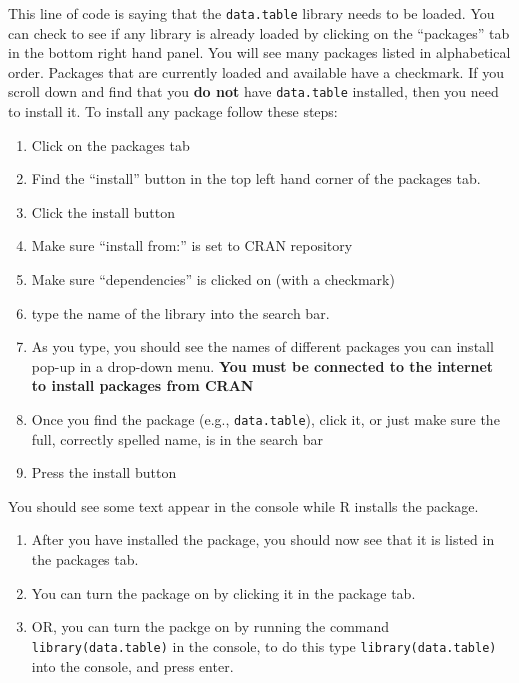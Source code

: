 \documentclass[
]{book}
\providecommand{\tightlist}{%
  \setlength{\itemsep}{0pt}\setlength{\parskip}{0pt}}
\begin{document}
This line of code is saying that the \texttt{data.table} library needs to be loaded. You can check to see if any library is already loaded by clicking on the ``packages'' tab in the bottom right hand panel. You will see many packages listed in alphabetical order. Packages that are currently loaded and available have a checkmark. If you scroll down and find that you \textbf{do not} have \texttt{data.table} installed, then you need to install it. To install any package follow these steps:

\begin{enumerate}
\def\labelenumi{\arabic{enumi}.}
\tightlist
\item
  Click on the packages tab
\item
  Find the ``install'' button in the top left hand corner of the packages tab.
\item
  Click the install button
\item
  Make sure ``install from:'' is set to CRAN repository
\item
  Make sure ``dependencies'' is clicked on (with a checkmark)
\item
  type the name of the library into the search bar.
\item
  As you type, you should see the names of different packages you can install pop-up in a drop-down menu. \textbf{You must be connected to the internet to install packages from CRAN}
\item
  Once you find the package (e.g., \texttt{data.table}), click it, or just make sure the full, correctly spelled name, is in the search bar
\item
  Press the install button
\end{enumerate}

You should see some text appear in the console while R installs the package.

\begin{enumerate}
\def\labelenumi{\arabic{enumi}.}
\setcounter{enumi}{9}
\tightlist
\item
  After you have installed the package, you should now see that it is listed in the packages tab.
\item
  You can turn the package on by clicking it in the package tab.
\item
  OR, you can turn the packge on by running the command \texttt{library(data.table)} in the console, to do this type \texttt{library(data.table)} into the console, and press enter.
\end{enumerate}
\end{document}
